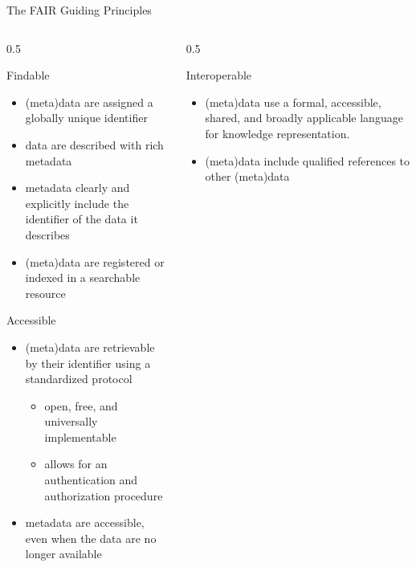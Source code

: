 \documentclass[ignorenonframetext,aspectratio=169,10pt,xcolor=table]{beamer}
\begin{document}
\begin{frame}{The FAIR Guiding Principles}
  \begin{columns} \scriptsize
    \begin{column}{0.5\textwidth}
      \begin{block}{Findable}
        \begin{itemize}
          \item (meta)data are assigned a globally unique identifier
          \item data are described with rich metadata
          \item metadata clearly and explicitly include the identifier of the data it describes
          \item (meta)data are registered or indexed in a searchable resource
        \end{itemize}
      \end{block}

      \begin{block}{Accessible}
        \begin{itemize}
          \item (meta)data are retrievable by their identifier using a standardized protocol
                \begin{itemize} \scriptsize
                  \item  open, free, and universally implementable
                  \item  allows for an authentication and authorization procedure
                \end{itemize}
          \item metadata are accessible, even when the data are no longer available
        \end{itemize}
      \end{block}
    \end{column}
    \begin{column}{0.5\textwidth}
      \begin{block}{Interoperable}
        \begin{itemize}
          \item (meta)data use a formal, accessible, shared, and broadly applicable language for knowledge representation.
          \item (meta)data include qualified references to other (meta)data
        \end{itemize}
      \end{block}


\end{column}
\end{columns}
\end{frame}
\end{document}
